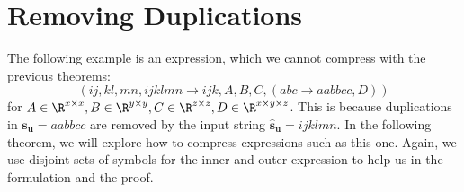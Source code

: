\section{Removing Duplications}

The following example is an expression, which we cannot compress with the previous theorems:
$$(ij, kl, mn, ijklmn \rightarrow ijk, A, B, C, (abc \rightarrow aabbcc, D))$$
for $A \in \R^{x \times x}, B \in \R^{y \times y}, C \in \R^{z \times z}, D \in \R^{x \times y \times z}$.
This is because duplications in $\bm{s_u} = aabbcc$ are removed by the input string $\bm{\hat{s}_u} = ijklmn$.
In the following theorem, we will explore how to compress expressions such as this one.
Again, we use disjoint sets of symbols for the inner and outer expression to help us in the formulation and the proof.

